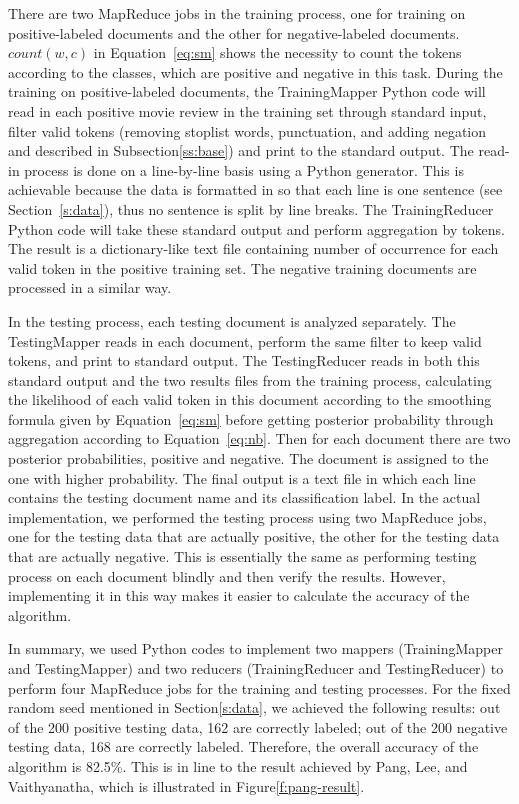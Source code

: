 There are two MapReduce jobs in the training process, one for training
on positive-labeled documents and the other for negative-labeled
documents.  $count(w,c)$ in Equation~\ref{eq:sm} shows the necessity
to count the tokens according to the classes, which are positive and
negative in this task.  During the training on positive-labeled
documents, the TrainingMapper Python code will read in each positive
movie review in the training set through standard input, filter valid
tokens (removing stoplist words, punctuation, and adding negation and
described in Subsection\ref{ss:base}) and print to the standard
output. The read-in process is done on a line-by-line basis using a
Python generator. This is achievable because the data is formatted in
so that each line is one sentence (see Section~\ref{s:data}), thus no
sentence is split by line breaks. The TrainingReducer Python code will
take these standard output and perform aggregation by tokens. The
result is a dictionary-like text file containing number of occurrence
for each valid token in the positive training set. The negative
training documents are processed in a similar way.

In the testing process, each testing document is analyzed
separately. The TestingMapper reads in each document, perform the same
filter to keep valid tokens, and print to standard output. The
TestingReducer reads in both this standard output and the two results
files from the training process, calculating the likelihood of each
valid token in this document according to the smoothing formula given
by Equation~\ref{eq:sm} before getting posterior probability through
aggregation according to Equation~\ref{eq:nb}. Then for each document
there are two posterior probabilities, positive and negative. The
document is assigned to the one with higher probability. The final
output is a text file in which each line contains the testing document
name and its classification label. In the actual implementation, we
performed the testing process using two MapReduce jobs, one for the
testing data that are actually positive, the other for the testing
data that are actually negative. This is essentially the same as
performing testing process on each document blindly and then verify
the results. However, implementing it in this way makes it easier to
calculate the accuracy of the algorithm.
 
In summary, we used Python codes to implement two mappers
(TrainingMapper and TestingMapper) and two reducers (TrainingReducer
and TestingReducer) to perform four MapReduce jobs for the training
and testing processes. For the fixed random seed mentioned in
Section\ref{s:data}, we achieved the following results: out of the 200
positive testing data, 162 are correctly labeled; out of the 200
negative testing data, 168 are correctly labeled. Therefore, the
overall accuracy of the algorithm is 82.5\%. This is in line to the
result achieved by Pang, Lee, and Vaithyanatha, which is illustrated
in Figure\ref{f:pang-result}.
% 

